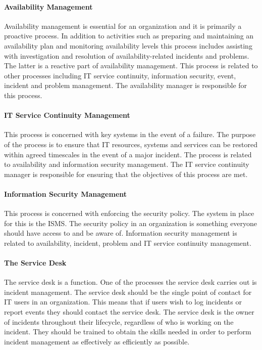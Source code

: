 \paragraph{Availability Management}
Availability management is essential for an organization and it is primarily a proactive process. In addition to activities such as preparing and maintaining an availability plan and monitoring availability levels this process includes assisting with investigation and resolution of availability-related incidents and problems. The latter is a reactive part of availability management. This process is related to other processes including IT service continuity, information security, event, incident and problem management. The availability manager is responsible for this process.

\paragraph{IT Service Continuity Management}
This process is concerned with key systems in the event of a failure. The purpose of the process is to ensure that IT resources, systems and services can be restored within agreed timescales in the event of a major incident. The process is related to availability and information security management. The IT service continuity manager is responsible for ensuring that the objectives of this process are met.

\paragraph{Information Security Management}
This process is concerned with enforcing the security policy. The system in place for this is the \acf{ISMS}. The security policy in an organization is something everyone should have access to and be aware of. Information security management is related to availability, incident, problem and IT service continuity management. 

\paragraph{The Service Desk}
The service desk is a function. One of the processes the service desk carries out is incident management. The service desk should be the single point of contact for IT users in an organization. This means that if users wish to log incidents or report events they should contact the service desk. The service desk is the owner of incidents throughout their lifecycle, regardless of who is working on the incident. They should be trained to obtain the skills needed in order to perform incident management as effectively as efficiently as possible.

